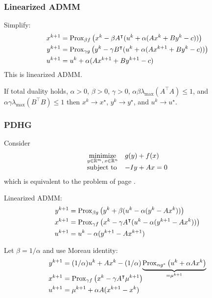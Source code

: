 \documentclass[10pt,mathserif]{beamer}
\begin{document}
\begin{frame}
\frametitle{Linearized ADMM}
Simplify:
\begin{align*}
x^{k+1}&=
\mathrm{Prox}_{\beta f}\left(
x^k-\beta A^\intercal( u ^k
+
\alpha (Ax^k+By^k-c))\right)\\
y^{k+1}&=
\mathrm{Prox}_{\gamma g}
\left(
y^k-\gamma B^\intercal( u ^k+\alpha (Ax^{k+1}+By^k-c) )
\right)\\
 u ^{k+1}&= u ^{k}+\alpha(Ax^{k+1}+By^{k+1}-c)
\end{align*}
This is linearized ADMM.

\vspace{0.2in}
If total duality holds, $\alpha>0$, $\beta>0$, $\gamma>0$,
$\alpha\beta\lambda_\mathrm{max}(A^\intercal A)\le 1$, and $\alpha\gamma\lambda_\mathrm{max}(B^\intercal B)\le 1$
then $x^k\rightarrow x^\star$, $y^k\rightarrow y^\star$, and $ u ^k\rightarrow u ^\star$.
\end{frame}


\begin{frame}[plain]
\frametitle{PDHG}
Consider 
\[
    \begin{array}{ll}
    \underset{y\in \mathbb{R}^m,\,x\in \mathbb{R}^n}{\mbox{minimize}}&g(y)+f(x)\\
    \mbox{subject to}&-Iy+Ax=0
    \end{array}
\]
which is equivalent to the problem of page \pageref{frame_pdhg1}.

\vspace{0.2in}

Linearized ADMM:
\begin{align*}
y^{k+1}&=
\mathrm{Prox}_{\beta g}
\left(
y^k+\beta ( u ^k-\alpha (y^k-Ax^{k}) )
\right)\\
x^{k+1}&=
\mathrm{Prox}_{\gamma f}\left(
x^k-\gamma A^\intercal( u ^k
-
\alpha (y^{k+1}-Ax^{k}))\right)\\
 u ^{k+1}&= u ^{k}-\alpha(y^{k+1}-Ax^{k+1})
\end{align*}
\vspace{0.1in}

Let $\beta=1/\alpha$ and use Moreau identity:
\begin{align*}
y^{k+1}&=(1/\alpha) u ^k+ Ax^{k}
-(1/\alpha)\underbrace{\mathrm{Prox}_{\alpha  g^*}\left( u ^k+\alpha Ax^k\right)}_{=\mu^{k+1}}\\[-1em]
x^{k+1}&=\mathrm{Prox}_{\gamma f}\left(x^k-\gamma A^\intercal\mu^{k+1}\right)\\
 u ^{k+1}&=\mu^{k+1}+\alpha A(x^{k+1}-x^k)
\end{align*}
\end{frame}
\end{document}
